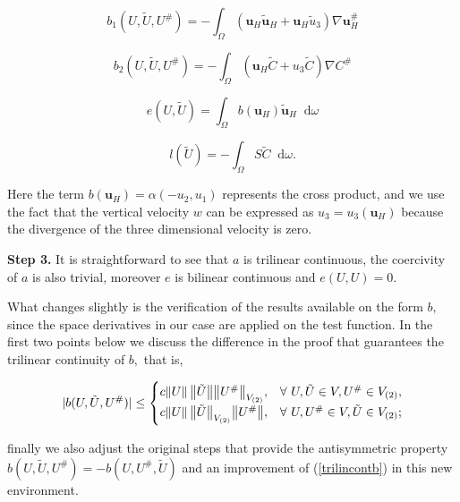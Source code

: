 \documentclass[11pt]{article}
\newcommand*\diff{\mathop{}\!\mathrm{d}}
\begin{document}
\[ b_1 (U, \tilde{U}, U^\#) = - \int_\Omega (\mathbf{u}_H \mathbf{\tilde{u}}_H + \mathbf{u}_H \tilde{u}_3) \nabla \mathbf{u}_H^\# \]

\[ b_2 (U, \tilde{U}, U^\#) = -  \int_\Omega (\mathbf{u}_H \tilde{C} + u_3 \tilde{C}) \nabla C^\# \]

\[ e(U, \tilde{U}) = \int_\Omega b(\mathbf{u}_H) \mathbf{\tilde{u}}_H \diff \omega \]

\[ l(\tilde{U}) = - \int_\Omega S \tilde{C} \diff \omega. \]

Here the term $b(\mathbf{u}_H) = \alpha (-u_2, u_1)$ represents the cross product, and we use the fact that the vertical velocity $w$ can be expressed as $u_3 = u_3(\mathbf{u}_H)$ because the divergence of the three dimensional velocity is zero.

\textbf{Step 3.} It is straightforward to see that $a$ is trilinear continuous, the coercivity of $a$ is also trivial, moreover $e$ is bilinear continuous and $e(U,U) = 0$.

What changes slightly is the verification of the results available on the form $b,$ since the space derivatives in our case are applied on the test function. In the first two points below we discuss the difference in the proof that guarantees the trilinear continuity of $b,$ that is,

\begin{equation} \label{trilincontb}
  \lvert b(U, \tilde{U}, U^\# ) \rvert \leq \begin{cases}
    c \norm{U} \big \|\tilde{U}\big \|  \big \| U^\#  \big \|_{V_{(2)}}, & \forall \text{ } U, \tilde{U} \in V, U^\# \in V_{(2)}, \\
    c \norm{U} \big \|\tilde{U}\big \| _{V_{(2)}} \big \| U^\#  \big \|, & \forall \text{ } U, U^\# \in V, \tilde{U}  \in V_{(2)};
  \end{cases}
\end{equation}

finally we also adjust the original steps that provide the antisymmetric property $b(U, \tilde{U}, U^\# ) = - b(U, U^\#, \tilde{U} )$ and an improvement of (\ref{trilincontb}) in this new environment.
\end{document}

